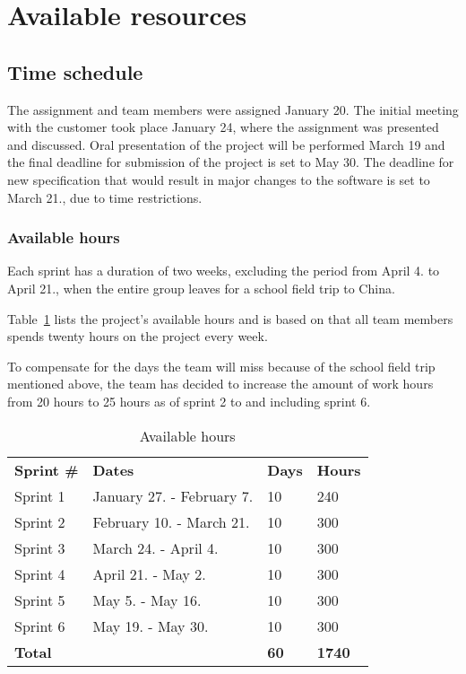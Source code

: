 \section{Available resources}
\subsection{Time schedule}
The assignment and team members were assigned January 20. The initial meeting with the customer took place January 24, where the assignment was presented and discussed. Oral presentation of the project will be performed March 19 and the final deadline for submission of the project is set to May 30. The deadline for new specification that would result in major changes to the software is set to March 21., due to time restrictions.

\subsubsection{Available hours}
Each sprint has a duration of two weeks, excluding the period from April 4. to April 21., when the entire group leaves for a school field trip to China.

Table~\ref{tab:availHours} lists the project's available hours and is based on that all team members spends twenty hours on the project every week.

To compensate for the days the team will miss because of the school field trip mentioned above, the team has decided to increase the amount of work hours from 20 hours to 25 hours as of sprint 2 to and including sprint 6.

\begin{table}[H]
\centering
{}
\begin{tabular}{|l|l|l|l|}
\hline
\textbf{Sprint \#} & \textbf{Dates} & \textbf{Days} & \textbf{Hours}\\
Sprint 1& January 27. - February 7. & 10  & 240 \\
Sprint 2 & February 10. - March 21. &10  & 300 \\
Sprint 3 & March 24. - April 4. &10 & 300 \\
Sprint 4 & April 21. - May 2. &10  &300 \\
Sprint 5 & May 5. - May 16. &10&  300 \\
Sprint 6 & May 19. - May 30. &10  &300 \\
\textbf{Total}&& \textbf{60}&  \textbf{1740}\\\hline
\end{tabular}
\caption{Available hours}
\label{tab:availHours}
\end{table}

